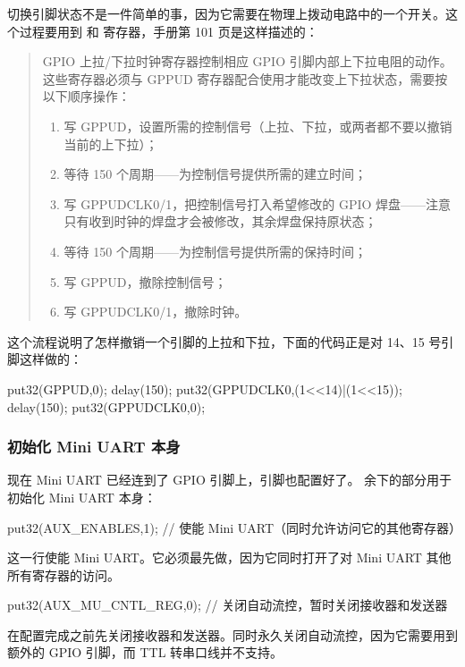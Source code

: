 切换引脚状态不是一件简单的事，因为它需要在物理上拨动电路中的一个开关。这个过程要用到  和  寄存器，手册第 101 页是这样描述的：

\begin{quote}
  GPIO 上拉/下拉时钟寄存器控制相应 GPIO 引脚内部上下拉电阻的动作。这些寄存器必须与 GPPUD 寄存器配合使用才能改变上下拉状态，需要按以下顺序操作：
  \begin{enumerate}
    \item 写 GPPUD，设置所需的控制信号（上拉、下拉，或两者都不要以撤销当前的上下拉）；
    \item 等待 150 个周期——为控制信号提供所需的建立时间；
    \item 写 GPPUDCLK0/1，把控制信号打入希望修改的 GPIO 焊盘——注意只有收到时钟的焊盘才会被修改，其余焊盘保持原状态；
    \item 等待 150 个周期——为控制信号提供所需的保持时间；
    \item 写 GPPUD，撤除控制信号；
    \item 写 GPPUDCLK0/1，撤除时钟。
  \end{enumerate}
\end{quote}

这个流程说明了怎样撤销一个引脚的上拉和下拉，下面的代码正是对 14、15 号引脚这样做的：

\begin{ccode}
	put32(GPPUD,0);
	delay(150);
	put32(GPPUDCLK0,(1<<14)|(1<<15));
	delay(150);
	put32(GPPUDCLK0,0);
\end{ccode}

\subsubsection{初始化 Mini UART 本身}

现在 Mini UART 已经连到了 GPIO 引脚上，引脚也配置好了。 余下的部分用于初始化 Mini UART 本身：

\begin{ccode}
	put32(AUX_ENABLES,1);       // 使能 Mini UART（同时允许访问它的其他寄存器）
\end{ccode}

这一行使能 Mini UART。它必须最先做，因为它同时打开了对 Mini UART 其他所有寄存器的访问。

\begin{ccode}
	put32(AUX_MU_CNTL_REG,0);   // 关闭自动流控，暂时关闭接收器和发送器
\end{ccode}

在配置完成之前先关闭接收器和发送器。同时永久关闭自动流控，因为它需要用到额外的 GPIO 引脚，而 TTL 转串口线并不支持。

